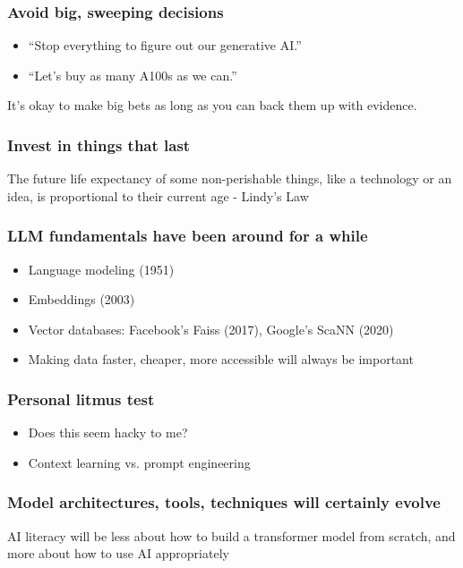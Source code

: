\begin{frame}[fragile]\frametitle{Avoid big, sweeping decisions}

\begin{itemize}
\item “Stop everything to figure out our generative AI.”
\item “Let’s buy as many A100s as we can.”
\end{itemize}	

It’s okay to make big bets as long as you can back them up with evidence.
\end{frame}

\begin{frame}[fragile]\frametitle{Invest in things that last}

The future life expectancy of some non-perishable things, like a technology or an 
idea, is proportional to their current age
- Lindy’s Law
\end{frame}

\begin{frame}[fragile]\frametitle{LLM fundamentals have been around for a while}

\begin{itemize}
\item Language modeling (1951)
\item Embeddings (2003)
\item Vector databases: Facebook’s Faiss (2017), Google’s ScaNN (2020)
\item Making data faster, cheaper, more accessible will always be important
\end{itemize}	

\end{frame}

\begin{frame}[fragile]\frametitle{Personal litmus test}

\begin{itemize}
\item Does this seem hacky to me?
\item Context learning vs. prompt engineering
\end{itemize}	

\end{frame}

\begin{frame}[fragile]\frametitle{Model architectures, tools, techniques will certainly evolve}

AI literacy will be less about how to build a transformer model from scratch, and 
more about how to use AI appropriately

\end{frame}

